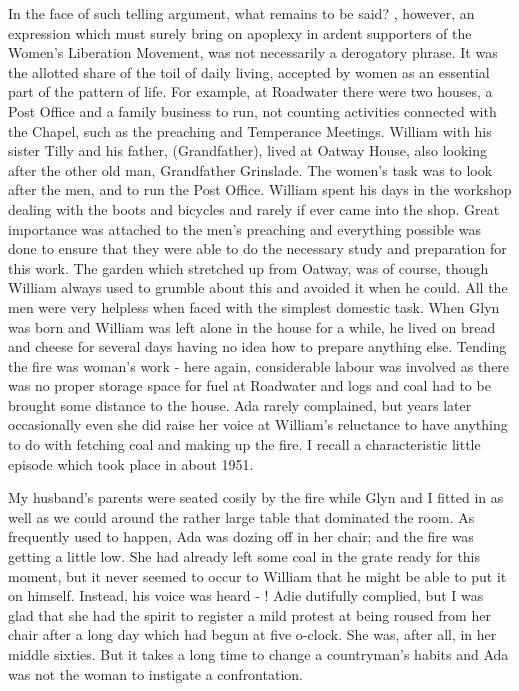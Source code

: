 In the face of such telling argument, what remains to be said? , however, an expression which must surely bring on apoplexy in ardent supporters of the Women's Liberation Movement, was not necessarily a derogatory phrase. It was the allotted share of the toil of daily living, accepted by women as an essential part of the pattern of life. For example, at Roadwater there were two houses, a Post Office and a family business to run, not counting activities connected with the Chapel, such as the preaching and Temperance Meetings. William with his sister Tilly and his father, (Grandfather), lived at Oatway House, also looking after the other old man, Grandfather Grinslade. The women's task was to look after the men, and to run the Post Office. William spent his days in the workshop dealing with the boots and bicycles and rarely if ever came into the shop. Great importance was attached to the men's preaching and everything possible was done to ensure that they were able to do the necessary study and preparation for this work. The garden which stretched up from Oatway, was  of course, though William always used to grumble about this and avoided it when he could. All the men were very helpless when faced with the simplest domestic task. When Glyn was born and William was left alone in the house for a while, he lived on bread and cheese for several days having no idea how to prepare anything else. Tending the fire was woman's work - here again, considerable labour was involved as there was no proper storage space for fuel at Roadwater and logs and coal had to be brought some distance to the house. Ada rarely complained, but years later occasionally even she did raise her voice at William's reluctance to have anything to do with fetching coal and making up the fire. I recall a characteristic little episode which took place in about 1951.

My husband's parents were seated cosily by the fire while Glyn and I fitted in as well as we could around the rather large table that dominated the room. As frequently used to happen, Ada was dozing off in her chair; and the fire was getting a little low. She had already left some coal in the grate ready for this moment, but it never seemed to occur to William that he might be able to put it on himself. Instead, his voice was heard - ! Adie dutifully complied, but I was glad that she had the spirit to register a mild protest at being roused from her chair after a long day which had begun at five o-clock. She was, after all, in her middle sixties. But it takes a long time to change a countryman's habits and Ada was not the woman to instigate a confrontation.

